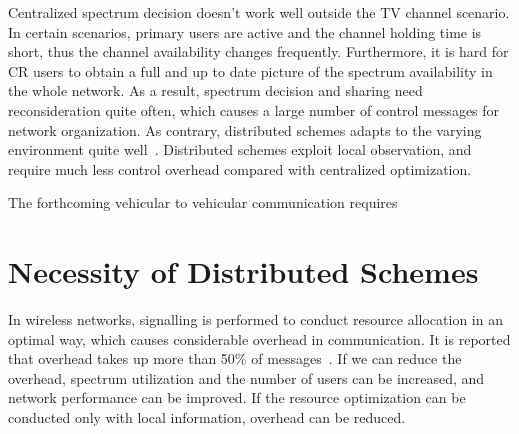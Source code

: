 Centralized spectrum decision doesn't work well outside the TV channel scenario.
In certain scenarios, primary users are active and the channel holding time is short, thus the channel availability changes frequently.
Furthermore, it is hard for CR users to obtain a full and up to date picture of the spectrum availability in the whole network.
As a result, spectrum decision and sharing need reconsideration quite often, which causes a large number of control messages for network organization.
As contrary, distributed schemes adapts to the varying environment quite well~\cite{Selforganization_CRN_13}.
Distributed schemes exploit local observation, and require much less control overhead compared with centralized optimization.

The forthcoming vehicular to vehicular communication requires






\section{Necessity of Distributed Schemes}
In wireless networks, signalling is performed to conduct resource allocation in an optimal way, which causes considerable overhead in communication.
It is reported that overhead takes up more than 50\% of messages~\cite{Han:2008:RAW:1457343}.
If we can reduce the overhead, spectrum utilization and the number of users can be increased, and network performance can be improved.
If the resource optimization can be conducted only with local information, overhead can be reduced.

